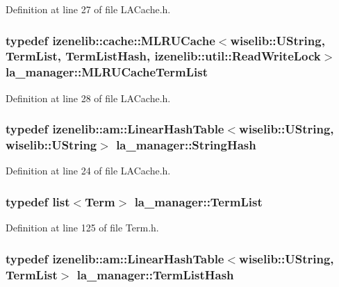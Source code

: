 Definition at line 27 of file LACache.h.\hypertarget{namespacela__manager_2ae131a60e2247f3f26c245dac7d0c56}{
\subsubsection[{MLRUCacheTermList}]{\setlength{\rightskip}{0pt plus 5cm}typedef izenelib::cache::MLRUCache$<$wiselib::UString, {\bf TermList}, {\bf TermListHash}, izenelib::util::ReadWriteLock$>$ {\bf la\_\-manager::MLRUCacheTermList}}}
\label{namespacela__manager_2ae131a60e2247f3f26c245dac7d0c56}




Definition at line 28 of file LACache.h.\hypertarget{namespacela__manager_b2561f2d031fc493a284cdce3afdd8fb}{
\subsubsection[{StringHash}]{\setlength{\rightskip}{0pt plus 5cm}typedef izenelib::am::LinearHashTable$<$wiselib::UString, wiselib::UString$>$ {\bf la\_\-manager::StringHash}}}
\label{namespacela__manager_b2561f2d031fc493a284cdce3afdd8fb}




Definition at line 24 of file LACache.h.\hypertarget{namespacela__manager_06c0aab93982ee3ebc3ef9d0419e619a}{
\subsubsection[{TermList}]{\setlength{\rightskip}{0pt plus 5cm}typedef list$<${\bf Term}$>$ {\bf la\_\-manager::TermList}}}
\label{namespacela__manager_06c0aab93982ee3ebc3ef9d0419e619a}




Definition at line 125 of file Term.h.\hypertarget{namespacela__manager_606b1224bbc6a202c407abf718ad3835}{
\subsubsection[{TermListHash}]{\setlength{\rightskip}{0pt plus 5cm}typedef izenelib::am::LinearHashTable$<$wiselib::UString, {\bf TermList}$>$ {\bf la\_\-manager::TermListHash}}}
\label{namespacela__manager_606b1224bbc6a202c407abf718ad3835}





